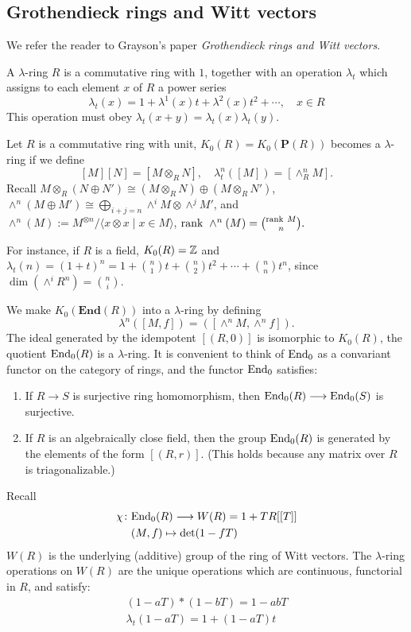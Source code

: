 \subsection{Grothendieck rings and Witt vectors}
\label{subsec:grothendieck_rings_and_witt_vectors}
We refer the reader to Grayson's paper {\em Grothendieck rings and Witt vectors}.
\begin{definition}
	A $\lambda$-ring $R$ is a commutative  ring with $1$, together with an operation $\lambda_t$ which assigns to each element $x$ of $R$ a power series
	\[\lambda_t(x)=1+\lambda^1(x)t+\lambda^2(x)t^2+\cdots, \quad x\in R\]
	This operation must obey $\lambda_t(x+y)=\lambda_t(x)\lambda_t(y)$. 
\end{definition}
Let $R$ is a commutative ring with unit, $K_0(R)=K_0(\mathbf{P}(R))$ becomes a $\lambda$-ring if we define 
\[[M][N]=[M\otimes_R N], \quad \lambda_t^n([M])=[\wedge^n_R M]. \]
Recall $M\otimes_R(N\oplus N')\cong (M\otimes_R N)\oplus(M\otimes_R N')$, $\wedge^n(M\oplus M')\cong \bigoplus_{i+j=n}\wedge^i M\otimes \wedge^j M'$, and $\wedge^n(M):=M^{\otimes n}/\langle x\otimes x \mid x\in M\rangle$, $\mathrm{rank\ } \wedge^n(M)=\binom{\mathrm{rank\ } M}{n}. $

For instance, if $R$ is a field, $K_0(R)=\mathbb{Z}$ and $\lambda_t(n)=(1+t)^n=1+\binom{n}{1}t+\binom{n}{2}t^2+\cdots+\binom{n}{n}t^n$, since $\dim (\wedge^i R^n)=\binom{n}{i}$.

We make $K_0(\mathbf{End}(R))$ into a $\lambda$-ring by defining
\[\lambda^n([M, f])=([\wedge^n M,\wedge^n f]).\]
The ideal generated by the idempotent $[(R,0)]$ is isomorphic to $K_0(R)$, the quotient $\mathrm{End}_0(R)$ is a $\lambda$-ring. It is convenient to think of $\mathrm{End}_0$ as a convariant functor on the category of rings, and the functor $\mathrm{End}_0$ satisfies:
\begin{enumerate}
	\item If $R\longrightarrow S$ is surjective ring homomorphism, then $\mathrm{End}_0(R)\longrightarrow \mathrm{End}_0(S)$ is surjective.
	\item If $R$ is an algebraically close field, then the group $\mathrm{End}_0(R)$ is generated by the elements of the form $[(R,r)]$. (This holds because any matrix over $R$ is triagonalizable.)
\end{enumerate}

Recall 
\begin{align*}
	\chi \colon&  \mathrm{End}_0(R)\longrightarrow W(R)=1+TR[[T]]\\
     & (M,f) \mapsto \det(1-fT)
\end{align*}
$W(R)$ is the underlying (additive) group of the ring of Witt vectors. The $\lambda$-ring operations on $W(R)$ are the unique operations which are continuous, functorial in $R$, and satisfy:
\begin{gather*}
	(1-aT)*(1-bT)=1-abT\\
	\lambda_t(1-aT)=1+(1-aT)t
\end{gather*}

